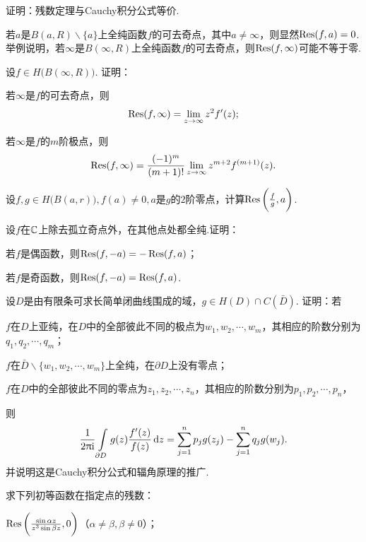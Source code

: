 \begin{xiti}
  \item 证明：残数定理与Cauchy积分公式等价.
  \item 若$a$是$B(a,R)\backslash\{a\}$上全纯函数$f$的可去奇点，其中$a\ne\infty$，则显然$\operatorname*{Res}(f,a)=0$.举例说明，若$\infty$是$B(\infty,R)$上全纯函数$f$的可去奇点，则$\operatorname*{Res}(f,\infty)$可能不等于零.
  \item 设$f\in H\big(B(\infty,R)\big)$. 证明：
    \begin{enuma}
      \item 若$\infty$是$f$的可去奇点，则
        \[
          \operatorname*{Res}(f,\infty) = \lim_{z\to\infty}z^2f'(z);
        \]
      \item 若$\infty$是$f$的$m$阶极点，则
        \[
          \operatorname*{Res}(f,\infty) = \frac{(-1)^m}{(m+1)!}\lim_{z\to\infty}z^{m+2}f^{(m+1)}(z).
        \]
    \end{enuma}
  \item 设$f,g\in H\big(B(a,r)\big),f(a)\ne0,a$是$g$的$2$阶零点，计算$\operatorname*{Res}\bigg(\frac fg,a\bigg)$.
  \item 设$f$在$\mathbb C$上除去孤立奇点外，在其他点处都全纯.证明：
    \begin{enuma}
      \item 若$f$是偶函数，则$\operatorname*{Res}(f,-a)=-\operatorname*{Res}(f,a)$；
      \item 若$f$是奇函数，则$\operatorname*{Res}(f,-a)=\operatorname*{Res}(f,a)$.
    \end{enuma}
  \item 设$D$是由有限条可求长简单闭曲线围成的域，$g\in H(D)\cap C(\bar D)$. 证明：若
    \begin{enuma}
      \item $f$在$D$上亚纯，在$D$中的全部彼此不同的极点为$w_1,w_2,\cdots,w_m$，其相应的阶数分别为
        $q_1,q_2,\cdots,q_m$；
      \item $f$在$\bar D\backslash\{w_1,w_2,\cdots,w_m\}$上全纯，在$\partial D$上没有零点；
      \item $f$在$D$中的全部彼此不同的零点为$z_1,z_2,\cdots,z_n$，其相应的阶数分别为$p_1,p_2,\cdots,p_n$，
    \end{enuma}
    则
    \[
      \frac1{2\uppi\mathrm i}\int\limits_{\partial D}g(z)\frac{f'(z)}{f(z)}\mathop{}\!\mathrm dz = \sum_{j=1}^n
      p_jg(z_j)-\sum_{j=1}^n q_jg(w_j).
    \]
    并说明这是Cauchy积分公式和辐角原理的推广.
  \item 求下列初等函数在指定点的残数：
    \begin{enuma}
      \item $\operatorname*{Res}\bigg(\frac{\sin\alpha z}{z^3\sin\beta z},0\bigg)$（$\alpha\ne\beta,\beta\ne0$）；

\end{enuma}
\end{xiti}
